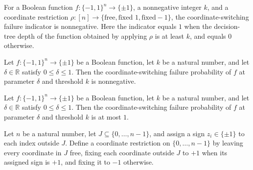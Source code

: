 \begin{theorem}
\label{FABL.coordSwitchingFailureIndicator_nonneg}
\leanok
{}
For a Boolean function $f:\{-1,1\}^n\to\{\pm1\}$, a nonnegative integer $k$, and a
coordinate restriction $\rho:[n]\to\{\text{free},\text{fixed }1,\text{fixed
}-1\}$, the coordinate-switching failure indicator is nonnegative. Here the indicator
equals $1$ when the decision-tree depth of the function obtained by applying $\rho$ is
at least $k$, and equals $0$ otherwise.
\end{theorem}

\begin{theorem}
\label{FABL.coordSwitchingFailureProbability_nonneg}
\leanok
{}
Let $f:\{-1,1\}^n\to\{\pm1\}$ be a Boolean function, let $k$ be a natural number,
and let $\delta\in\mathbb R$ satisfy $0\le\delta\le1$. Then the
coordinate-switching failure probability of $f$ at parameter $\delta$ and threshold $k$
is nonnegative.
\end{theorem}

\begin{theorem}
\label{FABL.coordSwitchingFailureProbability_le_one}
\leanok
{}
Let $f:\{-1,1\}^n\to\{\pm1\}$ be a Boolean function, let $k$ be a natural number,
and let $\delta\in\mathbb R$ satisfy $0\le\delta\le1$. Then the
coordinate-switching failure probability of $f$ at parameter $\delta$ and threshold $k$
is at most $1$.
\end{theorem}

\begin{definition}
\label{FABL.coordRestrictionOf}
\leanok
{}
Let $n$ be a natural number, let $J\subseteq\{0,\ldots,n-1\}$, and assign a sign
$z_i\in\{\pm1\}$ to each index outside $J$. Define a coordinate restriction on
$\{0,\ldots,n-1\}$ by leaving every coordinate in $J$ free, fixing each coordinate
outside $J$ to $+1$ when its assigned sign is $+1$, and fixing it to $-1$ otherwise.
\end{definition}


